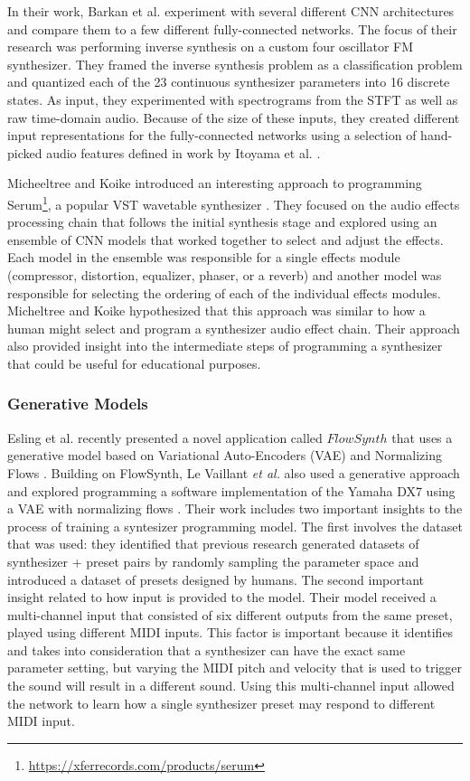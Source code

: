 In their work, Barkan et al. experiment with several different CNN architectures and compare them to a few different fully-connected networks. The focus of their research was performing inverse synthesis on a custom four oscillator FM synthesizer. They framed the inverse synthesis problem as a classification problem and quantized each of the 23 continuous synthesizer parameters into 16 discrete states. As input, they experimented with spectrograms from the STFT as well as raw time-domain audio. Because of the size of these inputs, they created different input representations for the fully-connected networks using a selection of hand-picked audio features defined in work by Itoyama et al. \cite{itoyama2014parameter}.

Micheeltree and Koike introduced an interesting approach to programming Serum\footnote{\url{https://xferrecords.com/products/serum}}, a popular VST wavetable synthesizer \cite{mitcheltree2021serumrnn}. They focused on the audio effects processing chain that follows the initial synthesis stage and explored using an ensemble of CNN models that worked together to select and adjust the effects. Each model in the ensemble was responsible for a single effects module (compressor, distortion, equalizer, phaser, or a reverb) and another model was responsible for selecting the ordering of each of the individual effects modules. Micheltree and Koike hypothesized that this approach was similar to how a human might select and program a synthesizer audio effect chain. Their approach also provided insight into the intermediate steps of programming a synthesizer that could be useful for educational purposes.

\subsubsection{Generative Models}
Esling et al. recently presented a novel application called $FlowSynth$ that uses a generative model based on Variational Auto-Encoders (VAE) and Normalizing Flows \cite{esling2020flow}. Building on FlowSynth, Le Vaillant \textit{et al.} also used a generative approach and explored programming a software implementation of the Yamaha DX7 using a VAE with normalizing flows \cite{le2021improving}. Their work includes two important insights to the process of training a syntesizer programming model. The first involves the dataset that was used: they identified that previous research generated datasets of synthesizer + preset pairs by randomly sampling the parameter space and introduced a dataset of presets designed by humans. The second important insight related to how input is provided to the model. Their model received a multi-channel input that consisted of six different outputs from the same preset, played using different MIDI inputs. This factor is important because it identifies and takes into consideration that a synthesizer can have the exact same parameter setting, but varying the MIDI pitch and velocity that is used to trigger the sound will result in a different sound. Using this multi-channel input allowed the network to learn how a single synthesizer preset may respond to different MIDI input.

